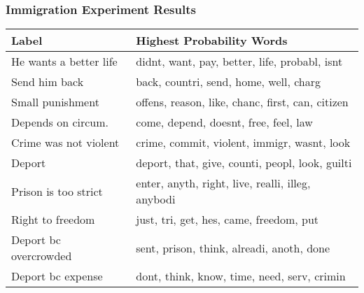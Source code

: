 \documentclass[xcolor=dvipsnames]{beamer}
\begin{document}
\begin{frame}
\frametitle{Immigration Experiment Results}

\begin{table}[ht!]
\centering
\small
\begin{tabular}{|p{1.5in}|p{2.75in}|}
  \hline
Label & Highest Probability Words \\
  \hline
He wants a better life & didnt, want, pay, better, life, probabl, isnt \\
Send him back & back, countri, send, home, well, charg \\
Small punishment & offens, reason, like, chanc, first, can, citizen \\
Depends on circum. & come, depend, doesnt, free, feel, law \\
Crime was not violent & crime, commit, violent, immigr, wasnt, look \\
Deport & deport, that, give, counti, peopl, look, guilti \\
Prison is too strict & enter, anyth, right, live, realli, illeg, anybodi \\
Right to freedom & just, tri, get, hes, came, freedom, put \\
Deport bc overcrowded & sent, prison, think, alreadi, anoth, done \\
Deport bc expense & dont, think, know, time, need, serv, crimin \\
   \hline
\end{tabular}
\end{table}
\end{frame}
\end{document}
